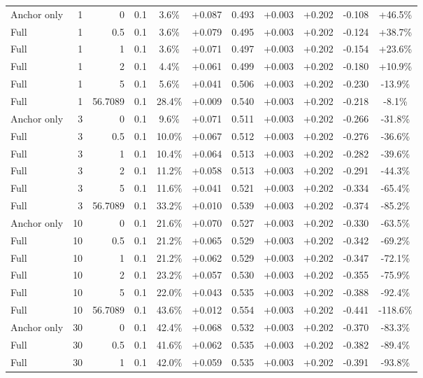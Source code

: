 \begin{table}[htbp]
\begin{tabular}{lrrrccccccc}
Anchor only & 1 & 0 & 0.1 & 3.6\% & +0.087 & 0.493 & +0.003 & +0.202 & -0.108 & +46.5\% \\
Full & 1 & 0.5 & 0.1 & 3.6\% & +0.079 & 0.495 & +0.003 & +0.202 & -0.124 & +38.7\% \\
Full & 1 & 1 & 0.1 & 3.6\% & +0.071 & 0.497 & +0.003 & +0.202 & -0.154 & +23.6\% \\
Full & 1 & 2 & 0.1 & 4.4\% & +0.061 & 0.499 & +0.003 & +0.202 & -0.180 & +10.9\% \\
Full & 1 & 5 & 0.1 & 5.6\% & +0.041 & 0.506 & +0.003 & +0.202 & -0.230 & -13.9\% \\
Full & 1 & 56.7089 & 0.1 & 28.4\% & +0.009 & 0.540 & +0.003 & +0.202 & -0.218 & -8.1\% \\
Anchor only & 3 & 0 & 0.1 & 9.6\% & +0.071 & 0.511 & +0.003 & +0.202 & -0.266 & -31.8\% \\
Full & 3 & 0.5 & 0.1 & 10.0\% & +0.067 & 0.512 & +0.003 & +0.202 & -0.276 & -36.6\% \\
Full & 3 & 1 & 0.1 & 10.4\% & +0.064 & 0.513 & +0.003 & +0.202 & -0.282 & -39.6\% \\
Full & 3 & 2 & 0.1 & 11.2\% & +0.058 & 0.513 & +0.003 & +0.202 & -0.291 & -44.3\% \\
Full & 3 & 5 & 0.1 & 11.6\% & +0.041 & 0.521 & +0.003 & +0.202 & -0.334 & -65.4\% \\
Full & 3 & 56.7089 & 0.1 & 33.2\% & +0.010 & 0.539 & +0.003 & +0.202 & -0.374 & -85.2\% \\
Anchor only & 10 & 0 & 0.1 & 21.6\% & +0.070 & 0.527 & +0.003 & +0.202 & -0.330 & -63.5\% \\
Full & 10 & 0.5 & 0.1 & 21.2\% & +0.065 & 0.529 & +0.003 & +0.202 & -0.342 & -69.2\% \\
Full & 10 & 1 & 0.1 & 21.2\% & +0.062 & 0.529 & +0.003 & +0.202 & -0.347 & -72.1\% \\
Full & 10 & 2 & 0.1 & 23.2\% & +0.057 & 0.530 & +0.003 & +0.202 & -0.355 & -75.9\% \\
Full & 10 & 5 & 0.1 & 22.0\% & +0.043 & 0.535 & +0.003 & +0.202 & -0.388 & -92.4\% \\
Full & 10 & 56.7089 & 0.1 & 43.6\% & +0.012 & 0.554 & +0.003 & +0.202 & -0.441 & -118.6\% \\
Anchor only & 30 & 0 & 0.1 & 42.4\% & +0.068 & 0.532 & +0.003 & +0.202 & -0.370 & -83.3\% \\
Full & 30 & 0.5 & 0.1 & 41.6\% & +0.062 & 0.535 & +0.003 & +0.202 & -0.382 & -89.4\% \\
Full & 30 & 1 & 0.1 & 42.0\% & +0.059 & 0.535 & +0.003 & +0.202 & -0.391 & -93.8\% \\

\end{tabular}
\end{table}
